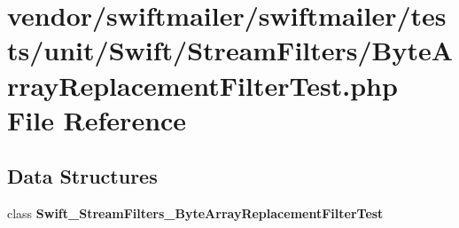 \section{vendor/swiftmailer/swiftmailer/tests/unit/\+Swift/\+Stream\+Filters/\+Byte\+Array\+Replacement\+Filter\+Test.php File Reference}
\label{_byte_array_replacement_filter_test_8php}
\subsection*{Data Structures}
\begin{DoxyCompactItemize}
\item 
class {\bf Swift\+\_\+\+Stream\+Filters\+\_\+\+Byte\+Array\+Replacement\+Filter\+Test}
\end{DoxyCompactItemize}
